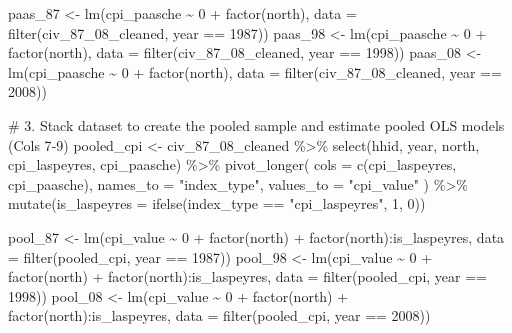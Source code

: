 \documentclass[
  letterpaper,
  DIV=11,
  numbers=noendperiod]{scrartcl}
\newenvironment{Shaded}{\begin{snugshade}}{\end{snugshade}}
\newcommand{\AttributeTok}[1]{\textcolor[rgb]{0.40,0.45,0.13}{#1}}
\newcommand{\CommentTok}[1]{\textcolor[rgb]{0.37,0.37,0.37}{#1}}
\newcommand{\DecValTok}[1]{\textcolor[rgb]{0.68,0.00,0.00}{#1}}
\newcommand{\FunctionTok}[1]{\textcolor[rgb]{0.28,0.35,0.67}{#1}}
\newcommand{\NormalTok}[1]{\textcolor[rgb]{0.00,0.23,0.31}{#1}}
\newcommand{\OtherTok}[1]{\textcolor[rgb]{0.00,0.23,0.31}{#1}}
\newcommand{\SpecialCharTok}[1]{\textcolor[rgb]{0.37,0.37,0.37}{#1}}
\newcommand{\StringTok}[1]{\textcolor[rgb]{0.13,0.47,0.30}{#1}}
\begin{document}
\begin{Shaded}
\begin{Highlighting}[]
\NormalTok{paas\_87 }\OtherTok{\textless{}{-}} \FunctionTok{lm}\NormalTok{(cpi\_paasche }\SpecialCharTok{\textasciitilde{}} \DecValTok{0} \SpecialCharTok{+} \FunctionTok{factor}\NormalTok{(north), }\AttributeTok{data =} \FunctionTok{filter}\NormalTok{(civ\_87\_08\_cleaned, year }\SpecialCharTok{==} \DecValTok{1987}\NormalTok{))}
\NormalTok{paas\_98 }\OtherTok{\textless{}{-}} \FunctionTok{lm}\NormalTok{(cpi\_paasche }\SpecialCharTok{\textasciitilde{}} \DecValTok{0} \SpecialCharTok{+} \FunctionTok{factor}\NormalTok{(north), }\AttributeTok{data =} \FunctionTok{filter}\NormalTok{(civ\_87\_08\_cleaned, year }\SpecialCharTok{==} \DecValTok{1998}\NormalTok{))}
\NormalTok{paas\_08 }\OtherTok{\textless{}{-}} \FunctionTok{lm}\NormalTok{(cpi\_paasche }\SpecialCharTok{\textasciitilde{}} \DecValTok{0} \SpecialCharTok{+} \FunctionTok{factor}\NormalTok{(north), }\AttributeTok{data =} \FunctionTok{filter}\NormalTok{(civ\_87\_08\_cleaned, year }\SpecialCharTok{==} \DecValTok{2008}\NormalTok{))}

\CommentTok{\# 3. Stack dataset to create the pooled sample and estimate pooled OLS models (Cols 7{-}9)}
\NormalTok{pooled\_cpi }\OtherTok{\textless{}{-}}\NormalTok{ civ\_87\_08\_cleaned }\SpecialCharTok{\%\textgreater{}\%}
  \FunctionTok{select}\NormalTok{(hhid, year, north, cpi\_laspeyres, cpi\_paasche) }\SpecialCharTok{\%\textgreater{}\%}
  \FunctionTok{pivot\_longer}\NormalTok{(}
    \AttributeTok{cols =} \FunctionTok{c}\NormalTok{(cpi\_laspeyres, cpi\_paasche),}
    \AttributeTok{names\_to =} \StringTok{"index\_type"}\NormalTok{,}
    \AttributeTok{values\_to =} \StringTok{"cpi\_value"}
\NormalTok{  ) }\SpecialCharTok{\%\textgreater{}\%}
  \FunctionTok{mutate}\NormalTok{(}\AttributeTok{is\_laspeyres =} \FunctionTok{ifelse}\NormalTok{(index\_type }\SpecialCharTok{==} \StringTok{"cpi\_laspeyres"}\NormalTok{, }\DecValTok{1}\NormalTok{, }\DecValTok{0}\NormalTok{))}

\NormalTok{pool\_87 }\OtherTok{\textless{}{-}} \FunctionTok{lm}\NormalTok{(cpi\_value }\SpecialCharTok{\textasciitilde{}} \DecValTok{0} \SpecialCharTok{+} \FunctionTok{factor}\NormalTok{(north) }\SpecialCharTok{+} \FunctionTok{factor}\NormalTok{(north)}\SpecialCharTok{:}\NormalTok{is\_laspeyres, }\AttributeTok{data =} \FunctionTok{filter}\NormalTok{(pooled\_cpi, year }\SpecialCharTok{==} \DecValTok{1987}\NormalTok{))}
\NormalTok{pool\_98 }\OtherTok{\textless{}{-}} \FunctionTok{lm}\NormalTok{(cpi\_value }\SpecialCharTok{\textasciitilde{}} \DecValTok{0} \SpecialCharTok{+} \FunctionTok{factor}\NormalTok{(north) }\SpecialCharTok{+} \FunctionTok{factor}\NormalTok{(north)}\SpecialCharTok{:}\NormalTok{is\_laspeyres, }\AttributeTok{data =} \FunctionTok{filter}\NormalTok{(pooled\_cpi, year }\SpecialCharTok{==} \DecValTok{1998}\NormalTok{))}
\NormalTok{pool\_08 }\OtherTok{\textless{}{-}} \FunctionTok{lm}\NormalTok{(cpi\_value }\SpecialCharTok{\textasciitilde{}} \DecValTok{0} \SpecialCharTok{+} \FunctionTok{factor}\NormalTok{(north) }\SpecialCharTok{+} \FunctionTok{factor}\NormalTok{(north)}\SpecialCharTok{:}\NormalTok{is\_laspeyres, }\AttributeTok{data =} \FunctionTok{filter}\NormalTok{(pooled\_cpi, year }\SpecialCharTok{==} \DecValTok{2008}\NormalTok{))}


\end{Highlighting}
\end{Shaded}
\end{document}
